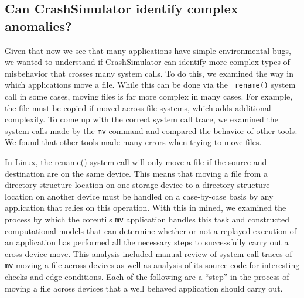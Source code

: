 
\subsection{Can CrashSimulator identify complex anomalies?}


Given that now we see that many applications have simple environmental bugs,
we wanted to understand if CrashSimulator can identify more complex types
of misbehavior that crosses many system calls.  To do this, we examined the
way in which applications move a file.  While this can be done via the {\tt
rename()} system call in some cases, moving files is far more complex in
many cases.  For example, the file must be copied if moved across file
systems, which adds additional complexity.  To come up with the correct
system call trace, we examined the system calls made by the {\tt mv}
command and compared the behavior of other tools.  We found that other
tools made many errors when trying to move files.

In Linux, the rename() system call will only move a file if the source and
destination are on the same device.  This means that moving a file from a
directory structure location on one storage device to a directory structure
location on another device must be handled on a case-by-case basis by any
application that relies on this operation.  With this in mined, we examined the
process by which the coreutils {\tt mv} application handles this task and
constructed computational models that can determine whether or not a replayed
execution of an application has performed all the necessary steps to
successfully carry out a cross device move.  This analysis included manual
review of system call traces of {\tt mv} moving a file across devices as well as
analysis of its source code for interesting checks and edge conditions.  Each of
the following are a ``step'' in the process of moving a file across devices that
a well behaved application should carry out.

